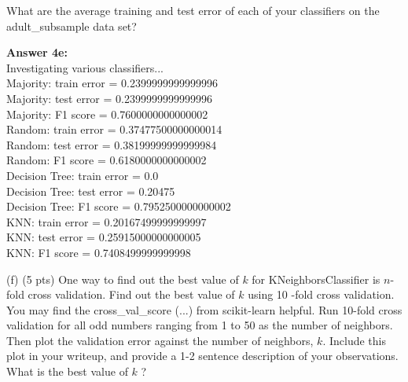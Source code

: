\documentclass[10pt]{article}
\begin{document}
What are the average training and test error of each of your classifiers on the adult\_subsample data set?

\hspace{1 cm}

\begin{flushleft}

\textbf{Answer 4e:} \\
Investigating various classifiers... \\
Majority:	 train error =	 0.2399999999999996 \\
Majority:	 test error =	 0.2399999999999996 \\
Majority:	 F1 score =	 0.7600000000000002 \\
Random:		 train error =	 0.37477500000000014 \\
Random:		 test error =	 0.38199999999999984 \\
Random:		 F1 score =	 0.6180000000000002 \\
Decision Tree:	 train error =	 0.0 \\
Decision Tree:	 test error =	 0.20475 \\
Decision Tree:	 F1 score =	 0.7952500000000002 \\
KNN:		 train error =	 0.20167499999999997 \\
KNN:		 test error =	 0.25915000000000005 \\
KNN:		 F1 score =	 0.7408499999999998 \\

    
\end{flushleft}

(f) (5 pts) One way to find out the best value of $k$ for KNeighborsClassifier is $n$-fold cross validation. Find out the best value of $k$ using 10 -fold cross validation. You may find the cross\_val\_score (...) from scikit-learn helpful. Run 10-fold cross validation for all odd numbers ranging from 1 to 50 as the number of neighbors. Then plot the validation error against the number of neighbors, $k$. Include this plot in your writeup, and provide a 1-2 sentence description of your observations. What is the best value of $k$ ?

\hspace{1 cm}
\end{document}

